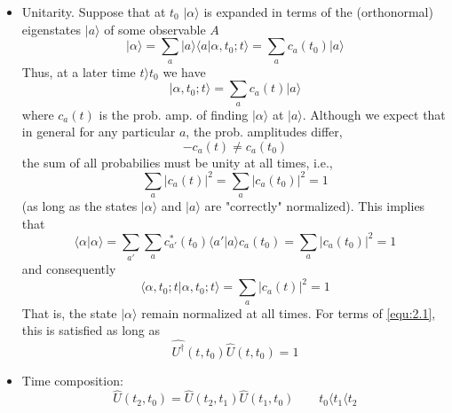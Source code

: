 \begin{itemize}
  \item Unitarity. Suppose that at $t_0$ $\vert \alpha\rangle $ is
    expanded in terms of the (orthonormal) eigenstates $\vert a\rangle $
    of some observable $A$
    \begin{equation}
      \vert \alpha\rangle  = \sum_a \vert a\rangle \langle a\vert \alpha,t_0;t\rangle  = \sum_a
      c_a(t_0)\vert a\rangle 
      \label{equ:2.2}
    \end{equation}
    Thus, at a later time $t \rangle  t_0$ we have
    \begin{equation}
      \vert \alpha,t_0;t\rangle  = \sum_a c_a(t) \vert a\rangle 
      \label{equ:2.3}
    \end{equation}
    where $c_a(t)$ is the prob. amp. of finding $\vert \alpha\rangle $
    at $\vert a\rangle $.
    Although we expect that in general for any particular
    $a$, the prob. amplitudes differ,
    $$-
      c_a(t) \neq c_a(t_0)
    $$
    the sum of all probabilies must be unity at all times,
    i.e.,
    \begin{equation}
      \sum_a \vert c_a(t)\vert ^2 = \sum_a \vert c_a(t_0)\vert ^2 = 1
      \label{equ:2.4}
    \end{equation}
    (as long as the states $\vert \alpha\rangle $ and $\vert a\rangle $ are
    "correctly" normalized).
    This implies that
    \begin{equation}
      \langle \alpha\vert \alpha\rangle  = \sum_{a'} \sum_a c_{a'}^*(t_0)
      \langle a'\vert a\rangle   c_a(t_0) = \sum_a \vert c_a(t_0)\vert ^2 = 1
      \label{equ:2.5}
    \end{equation}
    and consequently
    \begin{equation}
      \langle \alpha,t_0;t\vert \alpha,t_0;t\rangle  = \sum_a \vert c_a(t)\vert ^2 = 1
      \label{equ:2.6}
    \end{equation}
    That is, the state $\vert \alpha\rangle $ remain normalized at all
    times. For terms of \ref{equ:2.1}, this is satisfied as
    long as
    \begin{equation}
      \hat{U^\dagger}(t, t_0) \hat{U}(t,t_0) = 1
      \label{equ:2.7}
    \end{equation}
  \item Time composition:
    \begin{equation}
      \hat{U}(t_2,t_0) = \hat{U}(t_2,t_1) \hat{U}(t_1,t_0)
      \qquad t_0 \langle  t_1 \langle  t_2
      \label{equ:2.8}
    \end{equation}

\end{itemize}
